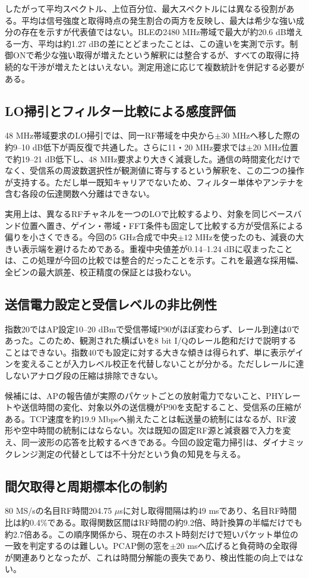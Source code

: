\documentclass[a4paper,10pt]{ltjsarticle}
\begin{document}
したがって平均スペクトル、上位百分位、最大スペクトルには異なる役割がある。平均は信号強度と取得時点の発生割合の両方を反映し、最大は希少な強い成分の存在を示すが代表値ではない。BLEの2480 MHz帯域で最大が約20.6 dB増える一方、平均は約1.27 dBの差にとどまったことは、この違いを実測で示す。制御ONで希少な強い取得が増えたという解釈には整合するが、すべての取得に持続的な干渉が増えたとはいえない。測定用途に応じて複数統計を併記する必要がある。

\subsection{LO掃引とフィルター比較による感度評価}
48 MHz帯域要求のLO掃引では、同一RF帯域を中央から$\pm30$ MHzへ移した際の約9--10 dB低下が両反復で共通した。さらに11・20 MHz要求では$\pm20$ MHz位置で約19--21 dB低下し、48 MHz要求より大きく減衰した。通信の時間変化だけでなく、受信系の周波数選択性が観測値に寄与するという解釈を、この二つの操作が支持する。ただし単一既知キャリアでないため、フィルター単体やアンテナを含む各段の伝達関数へ分離はできない。

実用上は、異なるRFチャネルを一つのLOで比較するより、対象を同じベースバンド位置へ置き、ゲイン・帯域・FFT条件も固定して比較する方が受信系による偏りを小さくできる。今回の5 GHz合成で中央$\pm12$ MHzを使ったのも、減衰の大きい表示端を避けるためである。重複中央値差が0.14--1.24 dBに収まったことは、この処理が今回の比較では整合的だったことを示す。これを最適な採用幅、全ビンの最大誤差、校正精度の保証とは扱わない。

\subsection{送信電力設定と受信レベルの非比例性}
指数20ではAP設定10--20 dBmで受信帯域P90がほぼ変わらず、レール到達は0であった。このため、観測された横ばいを8 bit I/Qのレール飽和だけで説明することはできない。指数40でも設定に対する大きな傾きは得られず、単に表示ゲインを変えることが入力レベル校正を代替しないことが分かる。ただしレールに達しないアナログ段の圧縮は排除できない。

候補には、APの報告値が実際のパケットごとの放射電力でないこと、PHYレートや送信時間の変化、対象以外の送信機がP90を支配すること、受信系の圧縮がある。TCP速度を約19.9 Mbpsへ揃えたことは転送量の統制にはなるが、RF波形や空中時間の統制にはならない。次は既知の固定RF源と減衰器で入力を変え、同一波形の応答を比較するべきである。今回の設定電力掃引は、ダイナミックレンジ測定の代替としては不十分だという負の知見を与える。

\subsection{間欠取得と周期標本化の制約}
80 MS/sの名目RF時間204.75 $\mu$sに対し取得間隔は約49 msであり、名目RF時間比は約0.4\%である。取得関数区間はRF時間の約9.2倍、時計換算の半幅だけでも約2.7倍ある。この順序関係から、現在のホスト時刻だけで短いパケット単位の一致を判定するのは難しい。PCAP側の窓を$\pm20$ msへ広げると負荷時の全取得が関連ありとなったが、これは時間分解能の喪失であり、検出性能の向上ではない。
\end{document}
